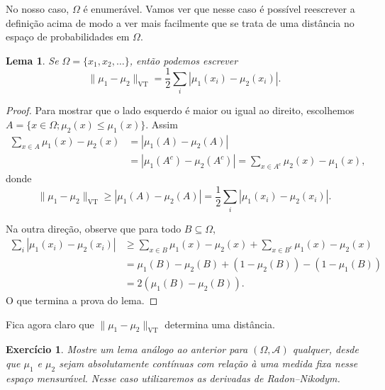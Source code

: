 \documentclass[reqno, final]{book}
\newcommand*\1{\mathds{1}}
\newtheorem{lemma}[theorem]{Lema}
\newtheorem{exercise}[example]{Exercício}
\DeclareMathOperator{\VT}{VT}
\begin{document}
No nosso caso, $\Omega$ é enumerável.
Vamos ver que nesse caso é possível reescrever a definição acima de modo a ver mais facilmente que se trata de uma distância no espaço de probabilidades em $\Omega$.

\begin{lemma}
\label{l:vt_l1}
Se $\Omega = \{x_1, x_2, \dots\}$, então podemos escrever
\begin{equation}
  \lVert \mu_1 - \mu_2 \rVert_{\VT} = \frac{1}{2} \sum_{i} |\mu_1(x_i) - \mu_2(x_i)|.
\end{equation}
\end{lemma}

\begin{proof}
Para mostrar que o lado esquerdo é maior ou igual ao direito, escolhemos $A = \{ x \in \Omega; \mu_2(x) \leq \mu_1(x)\}$. Assim
\begin{equation}
  \begin{split}
    \sum_{x \in A} \mu_1(x) - \mu_2(x) & = |\mu_1(A) - \mu_2(A)|\\
    & = |\mu_1(A^c) - \mu_2(A^c)| = \sum_{x \in A^c} \mu_2(x) - \mu_1(x),
  \end{split}
\end{equation}
donde
\begin{equation}
  \lVert \mu_1 - \mu_2 \rVert_{\VT} \geq |\mu_1(A) - \mu_2(A)| = \frac{1}{2} \sum_{i} |\mu_1(x_i) - \mu_2(x_i)|.
\end{equation}

Na outra direção, observe que para todo $B \subseteq \Omega$,
\begin{equation}
  \begin{split}
    \sum_{i} |\mu_1(x_i) - \mu_2(x_i)| & \geq \sum_{x \in B} \mu_1(x) - \mu_2(x) + \sum_{x \in B^c} \mu_1(x) - \mu_2(x)\\
    & = \mu_1(B) - \mu_2(B) + (1 - \mu_2(B)) - (1 - \mu_1(B))\\
    & = 2(\mu_1(B) - \mu_2(B)).
  \end{split}
\end{equation}
O que termina a prova do lema.
\end{proof}

Fica agora claro que $\lVert \mu_1 - \mu_2 \rVert_{\VT}$ determina uma distância.

\begin{exercise}
Mostre um lema análogo ao anterior para $(\Omega, \mathcal{A})$ qualquer, desde que $\mu_1$ e $\mu_2$ sejam absolutamente contínuas com relação à uma medida fixa nesse espaço mensurável. Nesse caso utilizaremos as derivadas de Radon–Nikodym.
\end{exercise}
\end{document}
